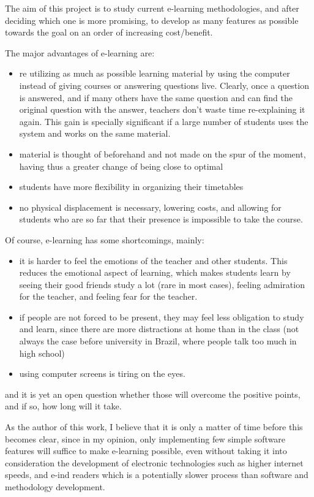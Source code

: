 \documentclass[12pt]{article}
\begin{document}
The aim of this project is to study current e-learning methodologies, and after deciding which one is more promising, to develop as many features as possible towards the goal on an order of increasing cost/benefit.

The major advantages of e-learning are:

\begin{itemize}
  \item re utilizing as much as possible learning material by using the computer instead of giving courses or answering questions live. Clearly, once a question is answered, and if many others have the same question and can find the original question with the answer, teachers don't waste time re-explaining it again. This gain is specially significant if a large number of students uses the system and works on the same material.
  \item material is thought of beforehand and not made on the spur of the moment, having thus a greater change of being close to optimal
  \item students have more flexibility in organizing their timetables
  \item no physical displacement is necessary, lowering costs, and allowing for students who are so far that their presence is impossible to take the course.
\end{itemize}

Of course, e-learning has some shortcomings, mainly:

\begin{itemize}
  \item it is harder to feel the emotions of the teacher and other students. This reduces the emotional aspect of learning, which makes students learn by seeing their good friends study a lot (rare in most cases), feeling admiration for the teacher, and feeling fear for the teacher.
  \item if people are not forced to be present, they may feel less obligation to study and learn, since there are more distractions at home than in the class (not always the case before university in Brazil, where people talk too much in high school)
  \item using computer screens is tiring on the eyes.
\end{itemize}

and it is yet an open question whether those will overcome the positive points, and if so, how long will it take.

As the author of this work, I believe that it is only a matter of time before this becomes clear, since in my opinion, only implementing few simple software features will suffice to make e-learning possible, even without taking it into consideration the development of electronic technologies such as higher internet speeds, and e-ind readers which is a potentially slower process than software and methodology development.
\end{document}
